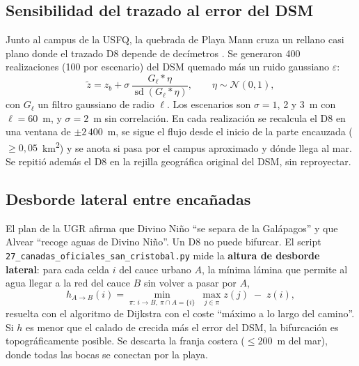\documentclass{sosg-informe}
\newcommand{\kmc}{km\textsuperscript{2}}
\begin{document}
\subsection{Sensibilidad del trazado al error del DSM}
Junto al campus de la USFQ, la quebrada de Playa Mann cruza un rellano casi plano donde el trazado D8 depende de decímetros \citep{wechsler2007}. Se generaron 400 realizaciones (100 por escenario) del DSM quemado más un ruido gaussiano $\varepsilon$:
\begin{equation}
  \tilde z = z_b + \sigma\, \frac{G_\ell * \eta}{\operatorname{sd}(G_\ell * \eta)}, \qquad \eta \sim \mathcal{N}(0, 1),
\end{equation}
con $G_\ell$ un filtro gaussiano de radio $\ell$. Los escenarios son $\sigma = 1$, 2 y 3~m con $\ell = 60$~m, y $\sigma = 2$~m sin correlación. En cada realización se recalcula el D8 en una ventana de $\pm 2\,400$~m, se sigue el flujo desde el inicio de la parte encauzada ($\geq 0{,}05$~\kmc) y se anota si pasa por el campus aproximado y dónde llega al mar. Se repitió además el D8 en la rejilla geográfica original del DSM, sin reproyectar.

\subsection{Desborde lateral entre encañadas}
El plan de la UGR afirma que Divino Niño \enquote{se separa de la Galápagos} y que Alvear \enquote{recoge aguas de Divino Niño}. Un D8 no puede bifurcar. El script \texttt{27\_canadas\_oficiales\_san\_cristobal.py} mide la \textbf{altura de desborde lateral}: para cada celda $i$ del cauce urbano $A$, la mínima lámina que permite al agua llegar a la red del cauce $B$ sin volver a pasar por $A$,
\begin{equation}
  h_{A \to B}(i) = \min_{\pi:\, i \to B,\ \pi \cap A = \{i\}}\ \max_{j \in \pi} z(j) \;-\; z(i),
\end{equation}
resuelta con el algoritmo de Dijkstra \citep{dijkstra1959} con el coste \enquote{máximo a lo largo del camino}. Si $h$ es menor que el calado de crecida más el error del DSM, la bifurcación es topográficamente posible. Se descarta la franja costera ($\leq 200$~m del mar), donde todas las bocas se conectan por la playa.
\end{document}

